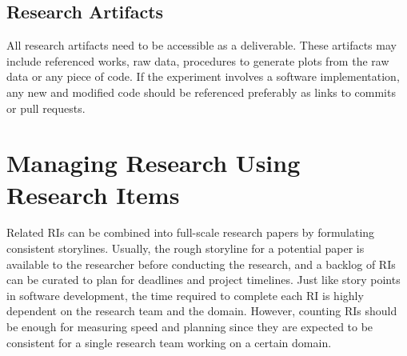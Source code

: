 \documentclass{article}
\begin{document}
\subsection{Research Artifacts}
All research artifacts need to be accessible as a deliverable. These artifacts may include referenced works, raw data, procedures to generate plots from the raw data or any piece of code. If the experiment involves a software implementation, any new and modified code should be referenced preferably as links to commits or pull requests. 

\section{Managing Research Using Research Items}
Related RIs can be combined into full-scale research papers by formulating consistent storylines. Usually, the rough storyline for a potential paper is available to the researcher before conducting the research, and a backlog of RIs can be curated to plan for deadlines and project timelines. Just like story points in software development, the time required to complete each RI is highly dependent on the research team and the domain. However, counting RIs should be enough for measuring speed and planning since they are expected to be consistent for a single research team working on a certain domain. 
\end{document}
